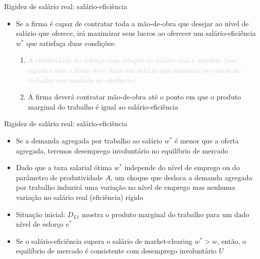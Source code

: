 \documentclass[10pt]{beamer}
\begin{document}
\begin{frame}{Rigidez de salário real: salário-eficiência}
    \begin{itemize}
        \item Se a firma é capaz de contratar toda a mão-de-obra que desejar ao nível de salário que oferece, irá maximizar seus lucros ao oferecer um salário-eficiência $w^*$ que satisfaça duas condições:\bigskip
        \begin{enumerate}
            \item \textcolor{lightgray}{A elasticidade do esforço com relação ao salário real é unitária (isso significa que a firma deve fixar um salário que minimize os custos do trabalho por unidade de eficiência)}\bigskip
            \item A firma deverá contratar mão-de-obra até o ponto em que o produto marginal do trabalho é igual ao salário-eficiência
        \end{enumerate}
    \end{itemize}
\end{frame}

\begin{frame}{Rigidez de salário real: salário-eficiência}
    \begin{itemize}
        \item Se a demanda agregada por trabalho ao salário $w^*$ é menor que a oferta agregada, teremos desemprego involuntário no equilíbrio de mercado\bigskip
        \item Dado que a taxa salarial ótima $w^*$ independe do nível de emprego ou do parâmetro de produtividade $A$, um choque que desloca a demanda agregada por trabalho induzirá uma variação no nível de emprego mas nenhuma variação no salário real (eficiência) rígido\bigskip
        \item Situação inicial: $D_{L1}$ mostra o produto marginal do trabalho para um dado nível de esforço $e^*$\bigskip
        \item Se o salário-eficiência supera o salário de market-clearing $w^* > w$, então, o equilíbrio de mercado é consistente com desemprego involuntário $U$
    \end{itemize}
\end{frame}
\end{document}
